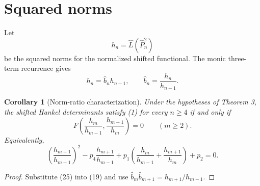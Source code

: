 \documentclass[11pt]{article}
\newtheorem{corollary}[theorem]{Corollary}
\theoremstyle{remark}
\begin{document}
\section{Squared norms}
Let
\begin{equation}
h_n=\widehat L(\widehat P_n^2)
\end{equation}
be the squared norms for the normalized shifted functional. The monic three-term recurrence gives
\begin{equation}
h_n=\widehat b_nh_{n-1},\qquad \widehat b_n=\frac{h_n}{h_{n-1}}.
\end{equation}
\begin{corollary}[Norm-ratio characterization]
Under the hypotheses of Theorem 3, the shifted Hankel determinants satisfy (1) for every $n\ge4$ if and only if
\begin{equation}
F\left(\frac{h_m}{h_{m-1}},\frac{h_{m+1}}{h_m}\right)=0\qquad(m\ge2).
\end{equation}
Equivalently,
\begin{equation}
\left(\frac{h_{m+1}}{h_{m-1}}\right)^2-p_4\frac{h_{m+1}}{h_{m-1}}
+p_1\left(\frac{h_m}{h_{m-1}}+\frac{h_{m+1}}{h_m}\right)+p_2=0.
\end{equation}
\end{corollary}
\begin{proof}
Substitute (25) into (19) and use $\widehat b_m\widehat b_{m+1}=h_{m+1}/h_{m-1}$.
\end{proof}
\end{document}

